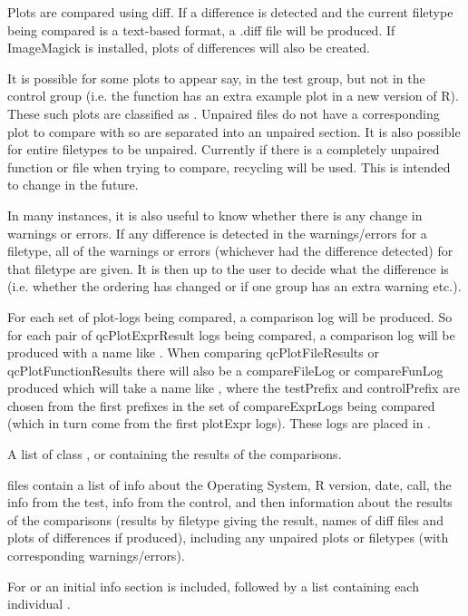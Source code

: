 \documentclass[a4paper,oneside]{report}
\begin{document}
\begin{Details}\relax
Plots are compared using  diff. If a difference is
detected and the current filetype being compared is a text-based
format, a .diff file will be produced. If ImageMagick is installed,
plots of differences will also be created.

It is possible for some plots to appear say, in the test group, but
not in the control group (i.e. the function  has an extra
example plot in a new version of R). These such plots are classified
as . Unpaired files do not have a corresponding plot
to compare with so are separated into an unpaired section. It is also
possible for entire filetypes to be unpaired. Currently if there is a
completely unpaired function or file when trying to compare, recycling
will be used. This is intended to change in the future.

In many instances, it is also useful to know whether there is any
change in warnings or errors. If any difference is detected in the
warnings/errors for a filetype, all of the warnings or errors
(whichever had the difference detected) for that filetype are
given. It is then up to the user to decide what the difference is
(i.e. whether the ordering has changed or if one group has an extra
warning etc.).

For each set of plot-logs being compared, a comparison log will be
produced. So for each pair of qcPlotExprResult logs being compared, a
comparison log will be produced with a name like
. When comparing
qcPlotFileResults or qcPlotFunctionResults there will also be a
compareFileLog or compareFunLog produced which will take a name like
, where the
testPrefix and controlPrefix are chosen from the first prefixes in the
set of compareExprLogs being compared (which in turn come from the first
plotExpr logs). These logs are placed in .
\end{Details}
\begin{Value}
A list of class ,  or
 containing the results of the comparisons.

 files contain a list of info about the Operating
System, R version, date, call, the info from the test, info from the
control, and then information about the results of the comparisons
(results by filetype giving the result, names of diff files and plots of
differences if produced), including any unpaired plots or filetypes
(with corresponding warnings/errors).

For  or  an initial info
section is included, followed by a list containing each individual
.
\end{Value}
\end{document}
